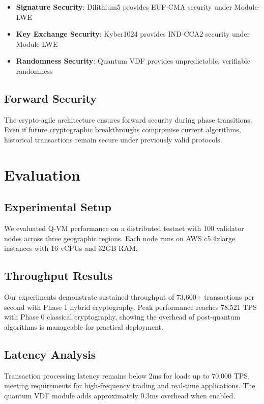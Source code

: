 \documentclass[11pt]{article}
\begin{document}
\begin{itemize}
    \item \textbf{Signature Security}: Dilithium5 provides EUF-CMA security under Module-LWE
    \item \textbf{Key Exchange Security}: Kyber1024 provides IND-CCA2 security under Module-LWE
    \item \textbf{Randomness Security}: Quantum VDF provides unpredictable, verifiable randomness
\end{itemize}

\subsection{Forward Security}

The crypto-agile architecture ensures forward security during phase transitions. Even if future cryptographic breakthroughs compromise current algorithms, historical transactions remain secure under previously valid protocols.

\section{Evaluation}

\subsection{Experimental Setup}

We evaluated Q-VM performance on a distributed testnet with 100 validator nodes across three geographic regions. Each node runs on AWS c5.4xlarge instances with 16 vCPUs and 32GB RAM.

\subsection{Throughput Results}

Our experiments demonstrate sustained throughput of 73,600+ transactions per second with Phase 1 hybrid cryptography. Peak performance reaches 78,521 TPS with Phase 0 classical cryptography, showing the overhead of post-quantum algorithms is manageable for practical deployment.

\subsection{Latency Analysis}

Transaction processing latency remains below 2ms for loads up to 70,000 TPS, meeting requirements for high-frequency trading and real-time applications. The quantum VDF module adds approximately 0.3ms overhead when enabled.
\end{document}
